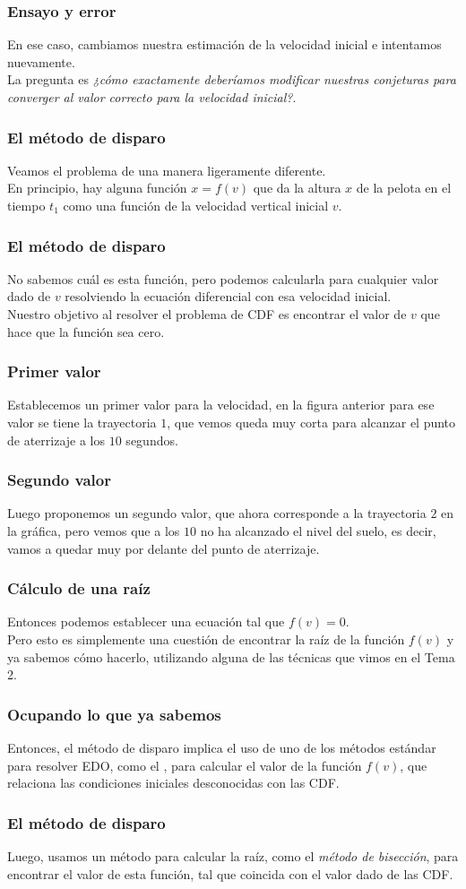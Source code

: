 \begin{frame}
\frametitle{Ensayo y error}
En ese caso, cambiamos nuestra estimación de la velocidad inicial e intentamos nuevamente.
\\
\bigskip
La pregunta es \emph{¿cómo exactamente deberíamos modificar nuestras conjeturas para converger al valor correcto para la velocidad inicial?}.
\end{frame}
\begin{frame}
\frametitle{El método de disparo}
Veamos el problema de una manera ligeramente diferente.
\\
\bigskip
En principio, hay alguna función $x = f (v)$ que da la altura $x$ de la pelota en el tiempo $t_{1}$ como una función de la velocidad vertical inicial $v$.
\end{frame}
\begin{frame}
\frametitle{El método de disparo}
No sabemos cuál es esta función, pero podemos calcularla para cualquier valor dado de $v$ resolviendo la ecuación diferencial con esa velocidad inicial.
\\
\bigskip
Nuestro objetivo al resolver el problema de CDF es encontrar el valor de $v$ que hace que la función sea cero.
\end{frame}
\begin{frame}
\frametitle{Primer valor}
Establecemos un primer valor para la velocidad, en la figura anterior para ese valor se tiene la trayectoria $1$, que vemos queda muy corta para alcanzar el punto de aterrizaje a los $10$ segundos.
\end{frame}
\begin{frame}
\frametitle{Segundo valor}
Luego proponemos un segundo valor, que ahora corresponde a la trayectoria $2$ en la gráfica, pero vemos que a los $10$ no ha alcanzado el nivel del suelo, es decir, vamos a quedar muy por delante del punto de aterrizaje.
\end{frame}    
\begin{frame}
\frametitle{Cálculo de una raíz}
Entonces podemos establecer una ecuación tal que $f (v) = 0$.
\\
\bigskip
Pero esto es simplemente una cuestión de encontrar la raíz de la función $f (v)$ y ya sabemos cómo hacerlo, utilizando alguna de las técnicas que vimos en el Tema 2.
\end{frame}
\begin{frame}
\frametitle{Ocupando lo que ya sabemos}
Entonces, el método de disparo implica el uso de uno de los métodos estándar para resolver EDO, como el , para calcular el valor de la función $f (v)$, que relaciona las condiciones iniciales desconocidas con las  CDF.
\end{frame}
\begin{frame}
\frametitle{El método de disparo}
Luego, usamos un método para calcular la raíz, como el \emph{método de bisección}, para encontrar el valor de esta función, tal que coincida con el valor dado de las CDF.
\end{frame}
